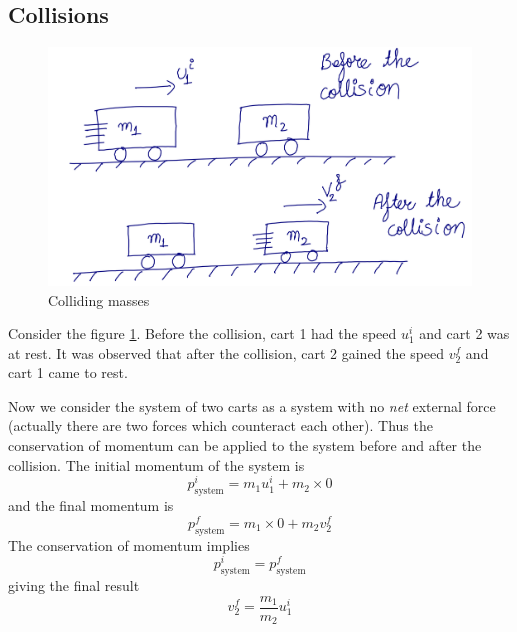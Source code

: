 \documentclass[10pt]{article}
\begin{document}
\subsection{Collisions}
\begin{figure}[h]
\includegraphics[scale=.4]{collidingmass}
\centering
\caption{Colliding masses}
\label{colmass}
\centering
\end{figure}
Consider the figure \ref{colmass}.  Before the collision, cart 1 had the speed $u_1^i$ and cart 2 was at rest.  It was observed that after the collision, cart 2 gained the speed $v_2^f$ and cart 1 came to rest.

Now we consider the system of two carts as a system with no \emph{net} external force (actually there are two forces which counteract each other).  Thus the conservation of momentum can be applied to the system before and after the collision.  The initial momentum of the system is
\begin{equation}
  p^i_{\text{system}} = m_1u_1^i + m_2\times 0
\end{equation}
and the final momentum is 
\begin{equation}
  p^f_{\text{system}} = m_1\times 0 + m_2v_2^f
\end{equation}
The conservation of momentum implies
\begin{equation}
  p^i_{\text{system}} = p^f_{\text{system}}
\end{equation}
giving the final result
\begin{equation}
  v_2^f = \frac{m_1}{m_2}u_1^i
\end{equation}
\end{document}
